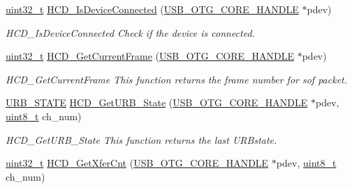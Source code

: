 \begin{DoxyCompactItemize}
\hyperlink{stdint_8h_a435d1572bf3f880d55459d9805097f62}{uint32\-\_\-t} \hyperlink{group___u_s_b___h_c_d___private___functions_ga74595e1854638eae4be812d804a4fe1b}{H\-C\-D\-\_\-\-Is\-Device\-Connected} (\hyperlink{group___u_s_b___c_o_r_e___exported___types_gaf76054c11eb8a3367907aad7ae700e80}{U\-S\-B\-\_\-\-O\-T\-G\-\_\-\-C\-O\-R\-E\-\_\-\-H\-A\-N\-D\-L\-E} $\ast$pdev)
\begin{DoxyCompactList}\small\item\em H\-C\-D\-\_\-\-Is\-Device\-Connected Check if the device is connected. \end{DoxyCompactList}\item 
\hyperlink{stdint_8h_a435d1572bf3f880d55459d9805097f62}{uint32\-\_\-t} \hyperlink{group___u_s_b___h_c_d___private___functions_ga3be73e419f4919980c1f6da01b179bee}{H\-C\-D\-\_\-\-Get\-Current\-Frame} (\hyperlink{group___u_s_b___c_o_r_e___exported___types_gaf76054c11eb8a3367907aad7ae700e80}{U\-S\-B\-\_\-\-O\-T\-G\-\_\-\-C\-O\-R\-E\-\_\-\-H\-A\-N\-D\-L\-E} $\ast$pdev)
\begin{DoxyCompactList}\small\item\em H\-C\-D\-\_\-\-Get\-Current\-Frame This function returns the frame number for sof packet. \end{DoxyCompactList}\item 
\hyperlink{group___u_s_b___c_o_r_e___exported___types_ga05286e84306322d89383fc7b6853e717}{U\-R\-B\-\_\-\-S\-T\-A\-T\-E} \hyperlink{group___u_s_b___h_c_d___private___functions_ga950fe167493f7dc6a66ca536de6f70b4}{H\-C\-D\-\_\-\-Get\-U\-R\-B\-\_\-\-State} (\hyperlink{group___u_s_b___c_o_r_e___exported___types_gaf76054c11eb8a3367907aad7ae700e80}{U\-S\-B\-\_\-\-O\-T\-G\-\_\-\-C\-O\-R\-E\-\_\-\-H\-A\-N\-D\-L\-E} $\ast$pdev, \hyperlink{stdint_8h_aba7bc1797add20fe3efdf37ced1182c5}{uint8\-\_\-t} ch\-\_\-num)
\begin{DoxyCompactList}\small\item\em H\-C\-D\-\_\-\-Get\-U\-R\-B\-\_\-\-State This function returns the last U\-R\-Bstate. \end{DoxyCompactList}\item 
\hyperlink{stdint_8h_a435d1572bf3f880d55459d9805097f62}{uint32\-\_\-t} \hyperlink{group___u_s_b___h_c_d___private___functions_gafc5ff8391e45b525c0c243477e7fd59a}{H\-C\-D\-\_\-\-Get\-Xfer\-Cnt} (\hyperlink{group___u_s_b___c_o_r_e___exported___types_gaf76054c11eb8a3367907aad7ae700e80}{U\-S\-B\-\_\-\-O\-T\-G\-\_\-\-C\-O\-R\-E\-\_\-\-H\-A\-N\-D\-L\-E} $\ast$pdev, \hyperlink{stdint_8h_aba7bc1797add20fe3efdf37ced1182c5}{uint8\-\_\-t} ch\-\_\-num)

\end{DoxyCompactItemize}
